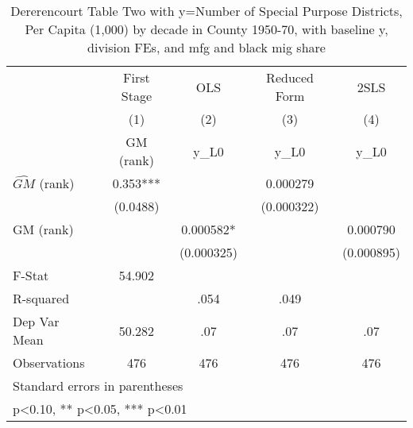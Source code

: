 \begin{table}[htbp]\centering
\def\sym#1{\ifmmode^{#1}\else\(^{#1}\)\fi}
\caption{Dererencourt Table Two with y=Number of Special Purpose Districts, Per Capita (1,000) by decade in County 1950-70, with baseline y, division FEs, and mfg and black mig share}
\begin{tabular}{l*{4}{c}}
\toprule
                    & First Stage   &         OLS   &Reduced Form   &        2SLS   \\
                    &\multicolumn{1}{c}{(1)}&\multicolumn{1}{c}{(2)}&\multicolumn{1}{c}{(3)}&\multicolumn{1}{c}{(4)}\\
                    &\multicolumn{1}{c}{GM  (rank)}&\multicolumn{1}{c}{y\_L0}&\multicolumn{1}{c}{y\_L0}&\multicolumn{1}{c}{y\_L0}\\
\midrule
$\hat{GM}$ (rank)   &       0.353***&               &    0.000279   &               \\
                    &    (0.0488)   &               &  (0.000322)   &               \\
\addlinespace
GM  (rank)          &               &    0.000582*  &               &    0.000790   \\
                    &               &  (0.000325)   &               &  (0.000895)   \\
\midrule
F-Stat              &      54.902   &               &               &               \\
R-squared           &               &        .054   &        .049   &               \\
Dep Var Mean        &      50.282   &         .07   &         .07   &         .07   \\
Observations        &         476   &         476   &         476   &         476   \\
\bottomrule
\multicolumn{5}{l}{\footnotesize Standard errors in parentheses}\\
\multicolumn{5}{l}{\footnotesize * p<0.10, ** p<0.05, *** p<0.01}\\
\end{tabular}
\end{table}
